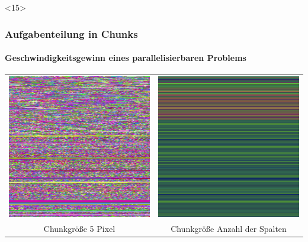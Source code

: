 \documentclass{beamer}
\begin{document}
\begin{frame}<15>
  \frametitle{Aufgabenteilung in Chunks}
  \framesubtitle{Geschwindigkeitsgewinn eines parallelisierbaren Problems}
  
  \begin{center}
    \begin{table}[]
      \begin{tabular}{cc}
        \includegraphics[scale=0.25]{chunksmall} & \includegraphics[scale=0.25]{chunkbig} \\
        Chunkgröße 5 Pixel & Chunkgröße Anzahl der Spalten 
      \end{tabular}
    \end{table}
  \end{center}

\end{frame}
\end{document}
